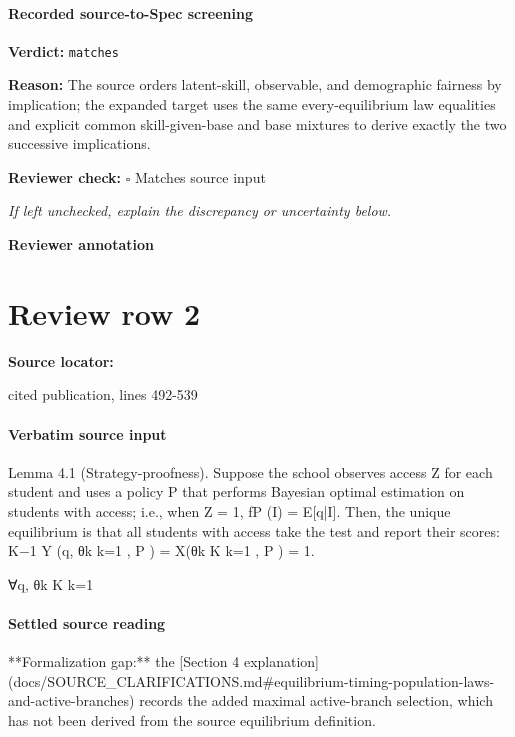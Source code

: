 \documentclass[10pt]{article}
\newcommand{\reviewerbox}{%
  \par\noindent\fbox{\parbox{0.96\linewidth}{\rule{0pt}{0.38in}}}\par
}
\newcommand{\reviewmatch}[1]{%
  \par\noindent\textbf{Reviewer check:} $\square$\; #1\par
  \noindent\emph{If left unchecked, explain the discrepancy or uncertainty below.}\par
}
\begin{document}
\paragraph{Recorded source-to-Spec screening}
\textbf{Verdict:} \texttt{matches}
\\
{\raggedright
\textbf{Reason:} The source orders latent-\allowbreak{}skill, observable, and demographic fairness by implication;\allowbreak{} the expanded target uses the same every-\allowbreak{}equilibrium law equalities and explicit common skill-\allowbreak{}given-\allowbreak{}base and base mixtures to derive exactly the two successive implications.\allowbreak{}
\par}
\reviewmatch{Matches source input}
\noindent\textbf{Reviewer annotation}\par
\reviewerbox
\clearpage
\hypertarget{source-claim-47d64178a8b01b72}{}
\section*{Review row 2}
\textbf{Source locator:} {\footnotesize\raggedright cited publication, lines 492-\allowbreak{}539\par}
\paragraph{Verbatim source input}
\begin{ReviewVerbatim}
Lemma 4.1 (Strategy-proofness). Suppose the school observes access Z for each student and uses
a policy P that performs Bayesian optimal estimation on students with access; i.e., when Z = 1,
fP (I) = E[q|I].
Then, the unique equilibrium is that all students with access take the test and report their scores:
K−1
Y (q, {θk }k=1
, P ) = X({θk }K
k=1 , P ) = 1.

∀q, {θk }K
k=1
\end{ReviewVerbatim}

\paragraph{Settled source reading}
\begin{sloppypar}
**Formalization gap:\allowbreak{}** the [Section 4 explanation](docs/\allowbreak{}SOURCE\_\allowbreak{}CLARIFICATIONS.\allowbreak{}md\#equilibrium-\allowbreak{}timing-\allowbreak{}population-\allowbreak{}laws-\allowbreak{}and-\allowbreak{}active-\allowbreak{}branches) records the added maximal active-\allowbreak{}branch selection, which has not been derived from the source equilibrium definition.\allowbreak{}
\end{sloppypar}
\end{document}
